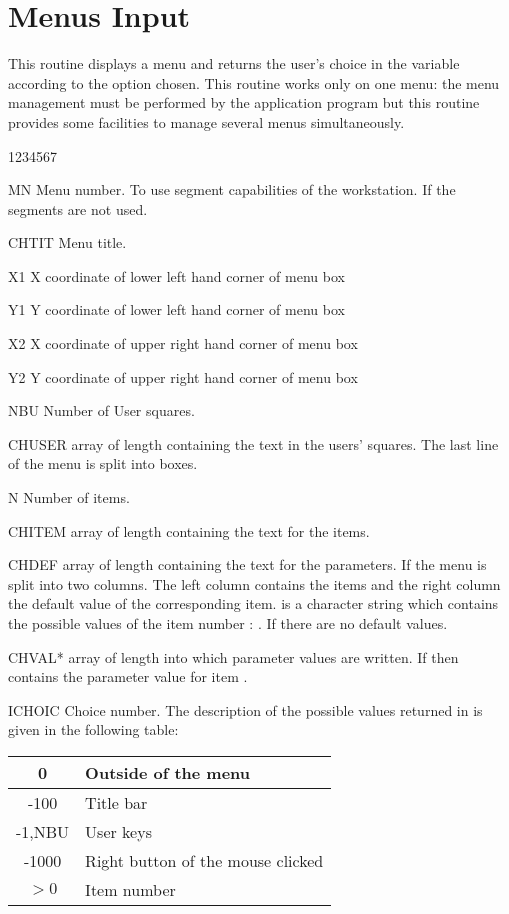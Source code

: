 \section{Menus Input}
\Action
This routine displays a menu and returns the user's choice in the variable
 according to the option chosen. This routine works only on one
menu: the menu management must be performed by the application program but this
routine provides some facilities to manage several menus simultaneously.
\Pdesc
\begin{DLtt}{1234567}
\item[MN] Menu number. To use segment capabilities of the workstation.
If  the segments are not used.
\item[CHTIT] Menu title.
\item[X1] X coordinate of lower left hand corner of menu box
\item[Y1] Y coordinate of lower left hand corner of menu box
\item[X2] X coordinate of upper right hand corner of menu box
\item[Y2] Y coordinate of upper right hand corner of menu box
\item[NBU] Number of User squares.
\item[CHUSER]  array of length 
containing the text in the users' squares.
The last line of the menu is split into  boxes.
\item[N] Number of items.
\item[CHITEM]  array of length 
containing the text for the items.
\item[CHDEF]  array of length 
containing the text for the parameters.
If  the menu is split into two columns.
The left column contains the items and
the right column the default value of the corresponding
item.
 is a character string which contains
the possible values of the item number :
.
If  there are no default values.
\item[CHVAL*]  array of length 
into which parameter values are written.
If  then  contains the
parameter value for item .
\item[ICHOIC] Choice number. The description of the possible values returned
in  is given in the following table:
\begin{center}
\begin{tabular}{||c|l||}
\hline
0       & Outside of the menu \\
\hline
-100    & Title bar           \\
\hline
-1,NBU  & User keys           \\
\hline
-1000   & Right button of the mouse clicked \\
\hline
 $> 0$  & Item number         \\
\hline
\end{tabular}
\end{center}


\end{DLtt}
